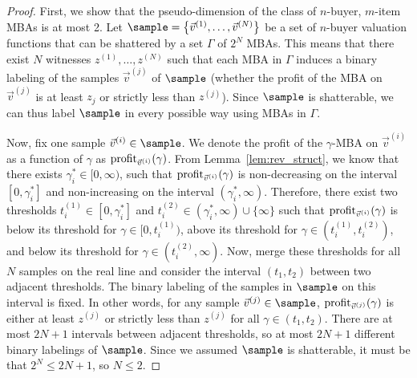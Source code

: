 \begin{proof} 
First, we show that the pseudo-dimension of the class of $n$-buyer, $m$-item MBAs is at most 2. Let $\sample = \left\{\vec{v}^{(1)}, \dots, \vec{v}^{(N)}\right\}$ be a set of $n$-buyer valuation functions that can be shattered by a set $\Gamma$ of $2^N$ MBAs. This means that there exist $N$ witnesses $z^{(1)}, \dots, z^{(N)}$ such that each MBA in $\Gamma$ induces a binary labeling of the samples $\vec{v}^{(j)}$ of $\sample$ (whether the profit of the MBA on $\vec{v}^{(j)}$ is at least $z_j$ or strictly less than $z^{(j)}$). Since $\sample$ is shatterable, we can thus label $\sample$ in every possible way using MBAs in $\Gamma$.

Now, fix one sample $\vec{v}^{(i)} \in \sample$. We denote the profit of the $\gamma$-MBA on $\vec{v}^{(i)}$ as a function of $\gamma$ as ${\normalfont \textnormal{profit}}_{\vec{v}^{(i)}}(\gamma)$. From Lemma~\ref{lem:rev_struct}, we know that there exists $\gamma^*_i \in [0,\infty)$, such that ${\normalfont \textnormal{profit}}_{\vec{v}^{(i)}}(\gamma)$ is non-decreasing on the interval $[0,\gamma^*_i]$ and non-increasing on the interval $(\gamma^*_i, \infty)$. Therefore, there exist two thresholds $t^{(1)}_i \in [0,\gamma^*_i]$ and $t^{(2)}_i \in (\gamma^*_i, \infty) \cup \{\infty\}$ such that ${\normalfont \textnormal{profit}}_{\vec{v}^{(i)}}(\gamma)$ is below its threshold for $\gamma \in [0,t^{(1)}_i)$, above its threshold for $\gamma \in (t^{(1)}_i, t^{(2)}_i)$, and below its threshold for $\gamma \in (t^{(2)}_i, \infty)$. Now, merge these thresholds for all $N$ samples on the real line and consider the interval $(t_1,t_2)$ between two adjacent thresholds. The binary labeling of the samples in $\sample$ on this interval is fixed. In other words, for any sample $\vec{v}^{(j)} \in \sample$, ${\normalfont \textnormal{profit}}_{\vec{v}^{(j)}}(\gamma)$ is either at least $z^{(j)}$ or strictly less than $z^{(j)}$ for all $\gamma \in (t_1,t_2)$. There are at most $2N+1$ intervals between adjacent thresholds, so at most $2N+1$ different binary labelings of $\sample$. Since we assumed $\sample$ is shatterable, it must be that $2^N \leq 2N+1$, so $N \leq 2.$


\end{proof}
